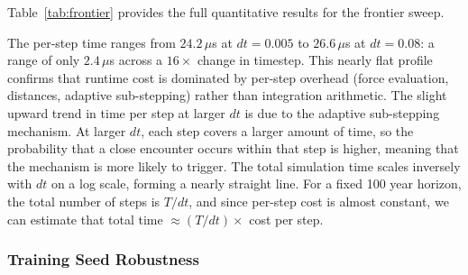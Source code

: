 \documentclass[12pt]{article}
\begin{document}
Table~\ref{tab:frontier} provides the full quantitative results for the frontier sweep.

\begin{table}[H]
\centering
\caption{Speed-accuracy frontier results for \texttt{SIMON} with adaptive
sub-stepping, $T = 100$\,yr. \texttt{ias15} baseline: $0.069$\,s total,
$\lambda = 0.1655$\,yr$^{-1}$ at $dt = 0.04$\,yr. Bold row = operational timestep.}
\label{tab:frontier}
\end{table}

The per-step time ranges from $24.2\,\mu$s at $dt = 0.005$ to $26.6\,\mu$s at
$dt = 0.08$: a range of only $2.4\,\mu$s across a $16\times$ change in timestep.
This nearly flat profile confirms that runtime cost is dominated by per-step overhead
(force evaluation, distances, adaptive sub-stepping) rather than integration arithmetic.
The slight upward trend in time per step at larger $dt$ is due to the adaptive
sub-stepping mechanism. At larger $dt$, each step covers a larger amount of time, so
the probability that a close encounter occurs within that step is higher, meaning that
the mechanism is more likely to trigger. The total simulation time scales inversely
with $dt$ on a log scale, forming a nearly straight line. For a fixed 100 year horizon,
the total number of steps is $T/dt$, and since per-step cost is almost constant, we
can estimate that total time $\approx (T/dt) \times$ cost per step.

\subsubsection{Training Seed Robustness}
\label{sec:seed_robustness}
\end{document}
